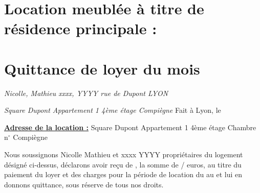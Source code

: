 \documentclass[a4paper,12pt]{article}
\begin{document}
\section*{\centering \Large Location meublée à titre de résidence principale :}
\section*{\centering \LARGE Quittance de loyer du mois  }


\begin{flushleft} 
\textit{\linebreak Nicolle, Mathieu \linebreak
xxxx, YYYY  rue de Dupont  LYON}
\end{flushleft}

\begin{flushright}
\textit{
  Square Dupont \linebreak
Appartement 1 4ème étage  Compiègne} \linebreak
\linebreak
Fait à Lyon, le 
\end{flushright}


\begin{flushleft} 
\underline{\textbf{Adresse de la location :}} Square Dupont \linebreak
Appartement 1 4ème étage \linebreak
Chambre n$^\circ$ Compiègne
\end{flushleft}
    
Nous soussignons Nicolle Mathieu et xxxx YYYY propriétaires du logement désigné ci-dessus, déclarons avoir reçu de , la somme de  /  euros, au titre du paiement du loyer et des charges pour la période de location du  au  et lui en donnons quittance, sous réserve de tous nos droits.
\end{document}
